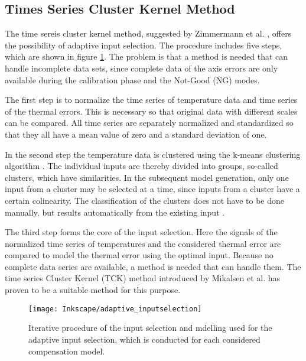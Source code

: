 \subsection{Times Series Cluster Kernel Method}
\label{sec:introTCK}

The time sereis cluster kernel method, suggested by Zimmermann et al. \cite{Zimmermann_2020}, offers the possibility of adaptive input selection. The procedure includes five steps, which are shown in figure \ref{fig:5steps}. The problem is that a method is needed that can handle incomplete data sets, since complete data of the axis errors are only available during the calibration phase and the Not-Good (NG) modes.

The first step is to normalize the time series of temperature data and time series of the thermal errors. This is necessary so that original data with different scales can be compared. All time series are separately normalized and standardized so that they all have a mean value of zero and a standard deviation of one.

In the second step the temperature data is clustered using the k-means clustering algorithm \cite{Lloyd_1982}. The individual inputs are thereby divided into groups, so-called clusters, which have similarities. In the subsequent model generation, only one input from a cluster may be selected at a time, since inputs from a cluster have a certain colinearity. The classification of the clusters does not have to be done manually, but results automatically from the existing input \cite{Pelleg_2000}. 

The third step forms the core of the input selection. Here the signals of the normalized time series of temperatures and the considered thermal error are compared to model the thermal error using the optimal input. Because no complete data series are available, a method is needed that can handle them. The time series Cluster Kernel (TCK) method introduced by Mikalsen et al. \cite{Mikalsen_2018} has proven to be a suitable method for this purpose.

\begin{figure}[!htb]
    \centering
    \texttt{[image: Inkscape/adaptive\_inputselection]} %
    \caption[Scheme of the TCK method]{Iterative procedure of the input selection and mdelling used for the adaptive input selection, which is conducted for each considered compensation model. \cite{Zimmermann_2020}}
    \label{fig:5steps}
\end{figure}

